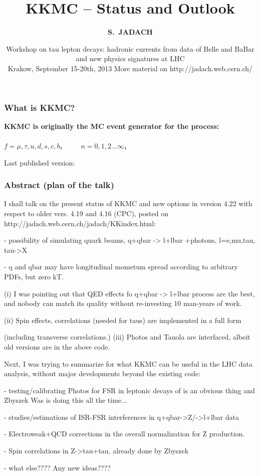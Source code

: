 \documentclass{beamer}
\title[Monte Carlo Methods] %
{ {\bf KKMC -- Status and Outlook}
} %
\author[S.~Jadach] %
{\Large\bf S.~JADACH }
\institute[Universities of Somewhere and Elsewhere] %
{ {\large\crd IFJ-PAN, Krak\'ow, Poland}\\
  {~~~}\\
  {\footnotesize
  Partly supported by Polish Government grant\\
  {\em Narodowe Centrum Nauki} DEC-2011/03/B/ST2/02632
}}
\date[Short Occasion] %
{\small Workshop on 
   tau lepton decays: hadronic currents from data of  Belle and BaBar 
   and new physics signatures at LHC\\
   Krakow,
   September 15-20th, 2013
\vskip 4mm
 \footnotesize
  More material on
  http://jadach.web.cern.ch/
}
\begin{document}
\begin{frame}
  \titlepage
\end{frame}


\begin{frame}[fragile]
\frametitle{\bf What is KKMC?}
\bf
KKMC is originally the MC event generator for the process:\\
~~~~~~~~~~~~~~\\
$f=\mu,\tau,u,d,s,c,b$,~~~~ $n=0,1,2...\infty$,

Last published version:


\end{frame}

\begin{frame}[fragile]
\frametitle{Abstract (plan of the talk)}

\footnotesize
I shall talk on the present status of KKMC and
new options in version 4.22 with respect to older vers. 4.19 and 4.16 (CPC),
posted on  http://jadach.web.cern.ch/jadach/KKindex.html:

  - possibility of simulating quark beams, q+qbar -> l+lbar +photons, l=e,mu,tau, tau->X
  
  - q and qbar may have longitudinal mometum spread according to arbitrary PDFs, but zero kT.
  
(i) I was pointing out that QED effects fo q+qbar -> l+lbar process are the best, 
 and nobody can match its quality  without re-investing 10 man-years of work.
 
(ii) Spin effects, correlations  (needed for taus) are implemented in a full form 

  (including transverse correlations.)
(iii) Photos and Tauola are interfaced, albeit old versions are in the above code.

Next, I was trying to summarize for what KKMC can be useful in the LHC data analysis,
without major developments beyond the existing code:

- testing/calibrating Photos for FSR in leptonic decays of
  is an obvious thing and Zbyszek Was is doing this all the time...
  
- studies/estimations of ISR-FSR interferences in q+qbar->Z/->l+lbar data

- Electroweak+QCD corrections in the overall normalization for Z production.

- Spin correlations in Z->tau+tau, already done by Zbyszek

- what else???? Any new ideas????

\end{frame}
\end{document}

